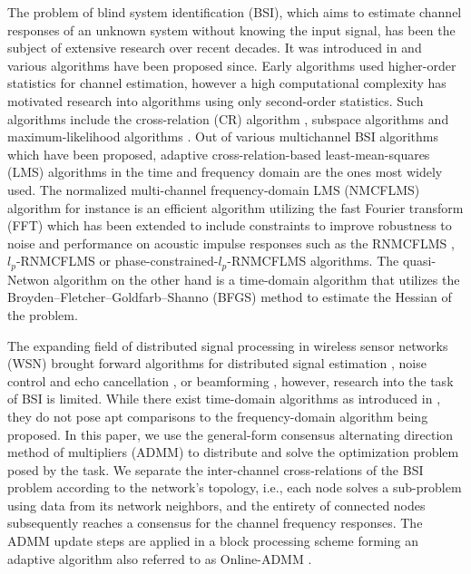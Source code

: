 \documentclass{article}
\begin{document}
The problem of blind system identification (BSI), which aims to estimate channel responses of an unknown system without knowing the input signal, has been the subject of extensive research over recent decades.
It was introduced in \cite{satoMethodSelfRecoveringEqualization1975} and various algorithms have been proposed since.
Early algorithms used higher-order statistics \cite{godardSelfRecoveringEqualizationCarrier1980,tongNewApproachBlind1991,mendelTutorialHigherorderStatistics1991} for channel estimation, however a high computational complexity has motivated research into algorithms using only second-order statistics.
Such algorithms include the cross-relation (CR) algorithm \cite{langtongBlindIdentificationEqualization1994, guanghanxuLeastsquaresApproachBlind1995}, subspace algorithms \cite{moulinesSubspaceMethodsBlind1995,gannotSubspaceMethodsMultimicrophone2003,diamantarasEfficientSubspaceMethod2008,mayyalaStructureBasedSubspaceMethod2017} and maximum-likelihood algorithms \cite{yingbohuaFastMaximumLikelihood1996}.
Out of various multichannel BSI algorithms which have been proposed, adaptive cross-relation-based least-mean-squares (LMS) algorithms in the time and frequency domain are the ones most widely used.
The normalized multi-channel frequency-domain LMS (NMCFLMS) \cite{huangAdaptiveMultichannelLeast2002,huangClassFrequencydomainAdaptive2003} algorithm for instance is an efficient algorithm utilizing the fast Fourier transform (FFT) which has been extended to include constraints to improve robustness to noise and performance on acoustic impulse responses such as the RNMCFLMS \cite{huNoiseRobustBlind2015}, \(l_p\)-RNMCFLMS \cite{heNoiseRobustFrequencyDomain2018} or phase-constrained-\(l_p\)-RNMCFLMS \cite{joRobustBlindMultichannel2021} algorithms.
The quasi-Netwon algorithm \cite{habetsOnlineQuasiNewtonAlgorithm2010} on the other hand is a time-domain algorithm that utilizes the Broyden–Fletcher–Goldfarb–Shanno (BFGS) \cite{brodlie1977assessment} method to estimate the Hessian of the problem.

The expanding field of distributed signal processing in wireless sensor networks (WSN) brought forward algorithms for distributed signal estimation \cite{5483092}, noise control and echo cancellation \cite{9670697}, or beamforming \cite{6663655,9670697}, however, research into the task of BSI is limited.
While there exist time-domain algorithms as introduced in \cite{yuDistributedBlindSystem2014,liuDistributedBlindIdentification2016,liuDistributedRecursiveBlind2017}, they do not pose apt comparisons to the frequency-domain algorithm being proposed.
In this paper, we use the general-form consensus alternating direction method of multipliers (ADMM) \cite{boydDistributedOptimizationStatistical2011} to distribute and solve the optimization problem posed by the task.
We separate the inter-channel cross-relations of the BSI problem according to the network's topology, i.e., each node solves a sub-problem using data from its network neighbors, and the entirety of connected nodes subsequently reaches a consensus for the channel frequency responses.
The ADMM update steps are applied in a block processing scheme forming an adaptive algorithm also referred to as Online-ADMM \cite{wangOnlineAlternatingDirection2013,hosseiniOnlineDistributedADMM2014}.
\end{document}
